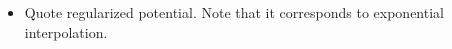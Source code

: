 \begin{itemize}
  \item {Quote regularized potential.  Note that it corresponds to exponential interpolation.}


\end{itemize}
